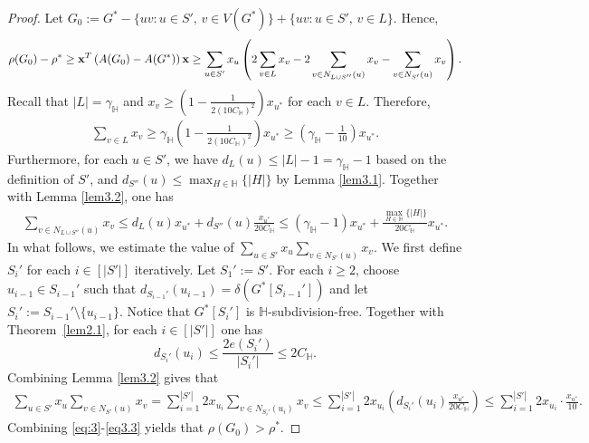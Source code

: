 \documentclass[11pt, a4paper]{article}
\theoremstyle{definition}
\newcommand{\<}{\subseteq}
\begin{document}
  \begin{proof}    
Let $G_0:=G^*-\{uv:u\in S',\, v\in V(G^*)\}+\{uv:u\in S',\,v\in L\}$.
Hence,
    \begin{align}\label{eq:3}
        \rho(G_0)-\rho^*\geq {\bf x}^T\left(A(G_0)-A(G^*)\right){\bf x}\geq\sum_{u\in S'}x_u\left(2\sum_{v\in L}{x_v}-2\sum_{v\in N_{L\cup S''}(u)}x_v-\sum_{v\in N_{S'}(u)}x_v\right).
    \end{align}
Recall that $|L|=\gamma_\mathbb{H}$ and $x_v\geq \left(1-\frac{1}{2(10C_\mathbb{H})^2}\right)x_{u^*}$ for each $v\in L$. Therefore,  
    \begin{align}\label{eq3.1}
        \sum_{v\in L}x_v\geq \gamma_\mathbb{H}\left(1-\frac{1}{2(10C_\mathbb{H})^2}\right)x_{u^*}\geq\left(\gamma_\mathbb{H}-\frac{1}{10}\right)x_{u^*}.
    \end{align}
Furthermore, for each $u\in S'$, we have $d_L(u)\leq|L|-1=\gamma_\mathbb{H}-1$ based on the definition of $S'$, and $d_{S''}(u)\leq \max_{H\in \mathbb{H}}\{|H|\}$ by Lemma \ref{lem3.1}. Together with Lemma \ref{lem3.2}, one has  
\begin{align}\label{eq3.2}
\sum_{v\in N_{L\cup S''}(u)}x_v\leq d_L(u)x_{u^*}+d_{S''}(u)\frac{x_{u^*}}{20C_\mathbb{H}}\leq\left(\gamma_\mathbb{H}-1\right)x_{u^*}+\frac{\max_{H\in \mathbb{H}}\{|H|\}}{20C_\mathbb{H}}x_{u^*}.
\end{align}
    In what follows, we estimate the value of $\sum_{u\in S'}x_u\sum_{v\in N_{S'}(u)}x_v$. We first define $S_i'$ for each $i\in [|S'|]$ iteratively. Let $S_1':=S'$. 
For each $i\geq 2$, choose $u_{i-1}\in S_{i-1}'$ such that $d_{S_{i-1}'}(u_{i-1})=\delta(G^*[S_{i-1}'])$ and let $S_i':=S_{i-1}'\setminus \{u_{i-1}\}$. Notice that $G^*[S_i']$ is $\mathbb{H}$-subdivision-free. Together with Theorem~\ref{lem2.1}, for each $i\in [|S'|]$ one has 
$$
d_{S_i'}(u_i)\leq \frac{2e(S_i')}{|S_i'|}\leq 2C_\mathbb{H}.
$$ 
    Combining Lemma \ref{lem3.2} gives that \allowdisplaybreaks
    \begin{align}\label{eq3.3}
\sum_{u\in S'}x_u\sum_{v\in N_{S'}(u)}x_v=\sum_{i=1}^{|S'|}2x_{u_i}\sum_{v\in N_{S_i'} (u_i)}x_v\leq %
\sum_{i=1}^{|S'|}2x_{u_i}\left(d_{S_i'}(u_i)\frac{x_{u^*}}{20C_\mathbb{H}}\right)%
\leq \sum_{i=1}^{|S'|}2x_{u_i}\cdot\frac{x_{u^*}}{10}. 
    \end{align}
Combining \eqref{eq:3}-\eqref{eq3.3} yields that $\rho(G_0)>\rho^*$. 
    

\end{proof}
\end{document}
